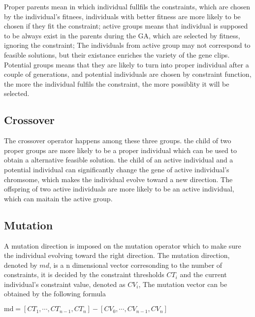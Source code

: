 Proper parents mean in which individual fullfils the constraints, which are
chosen by the individual's fitnees, individuals with better fitness are more
likely to be chosen if they fit the constraint; active groups means that
individual is supposed to be always exist in the parents during the GA, which
are selected by fitness, ignoring the constraint; The individuals from active
group may not correspond to feasible solutions, but their existance enriches the
variety of the gene clips.  Potential groups means that they are likely to turn
into proper individual after a couple of generations, and potential individuals
are chosen by constraint function, the more the individual fulfils the
constraint, the more possiblity it will be selected.

\subsection{Crossover}
The crossover operator happens among these three groups. the child of two proper
groups are more likely to be a proper individual which can be used to obtain a
alternative feasible solution. the child of an active individual and a potential
individual can significantly change the gene of active individual's chromsome,
which makes the individual evolve toward a new direction. The offspring of two
active individuals are more likely to be an active individual, which can maitain
the active group. 

\subsection{Mutation}
A mutation direction is imposed on the mutation operator which to make sure the
individual evolving toward the right direction. The mutation direction, denoted
by $md$, is a n dimensional vector corresonding to the number of constraints, it
is decided by the constraint thresholds $CT_i$ and the current individual's
constraint value, denoted as $CV_i$,  The mutation vector can be obtained by the
following formula

$\text{md} = [CT_1, \cdots, CT_{n-1}, CT_n] -  [CV_0, \cdots, CV_{n-1}, CV_n]$

